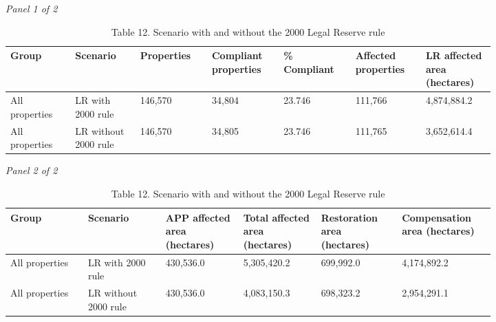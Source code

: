 \documentclass[12pt]{article}
\begin{document}
\begin{landscape}
\begin{table}[H]
\centering
\caption{Table 12. Scenario with and without the 2000 Legal Reserve rule}
\textit{Panel 1 of 2}\\[2pt]
{\fontsize{12}{14}\selectfont
\setlength{\tabcolsep}{3pt}
\renewcommand{\arraystretch}{1.08}
\begin{tabular}{p{0.117\linewidth}p{0.117\linewidth}p{0.117\linewidth}p{0.117\linewidth}p{0.117\linewidth}p{0.117\linewidth}p{0.117\linewidth}}
\toprule
Group & Scenario & Properties & Compliant properties & \% Compliant & Affected properties & LR affected area (hectares) \\
\midrule
All properties & LR with 2000 rule & 146,570 & 34,804 & 23.746 & 111,766 & 4,874,884.2 \\
All properties & LR without 2000 rule & 146,570 & 34,805 & 23.746 & 111,765 & 3,652,614.4 \\
\bottomrule
\end{tabular}
}

\vspace{0.6em}

\textit{Panel 2 of 2}\\[2pt]
{\fontsize{12}{14}\selectfont
\setlength{\tabcolsep}{3pt}
\renewcommand{\arraystretch}{1.08}
\begin{tabular}{p{0.137\linewidth}p{0.137\linewidth}p{0.137\linewidth}p{0.137\linewidth}p{0.137\linewidth}p{0.137\linewidth}}
\toprule
Group & Scenario & APP affected area (hectares) & Total affected area (hectares) & Restoration area (hectares) & Compensation area (hectares) \\
\midrule
All properties & LR with 2000 rule & 430,536.0 & 5,305,420.2 & 699,992.0 & 4,174,892.2 \\
All properties & LR without 2000 rule & 430,536.0 & 4,083,150.3 & 698,323.2 & 2,954,291.1 \\
\bottomrule
\end{tabular}
}
\end{table}
\end{landscape}
\end{document}
